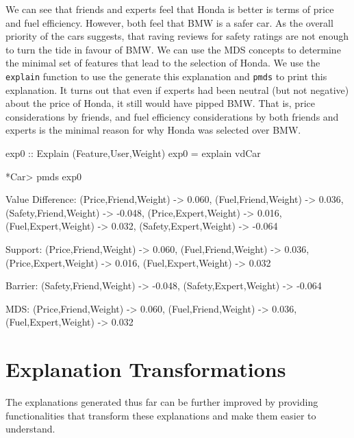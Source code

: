 \documentclass{jfp}
\newcommand{\prog}[1]{\texttt{#1}}
\begin{document}
We can see that friends and experts feel that Honda is better is terms of price and fuel efficiency. However, both feel that BMW is a safer car. As the overall priority of the cars suggests, that raving reviews for safety ratings are not enough to turn the tide in favour of BMW. We can use the MDS concepts to determine the minimal set of features that lead to the selection of Honda. We use the \prog{explain} function to use the generate this explanation and \prog{pmds} to print this explanation. It turns out that even if experts had been neutral (but not negative) about the price of Honda, it still would have pipped BMW. That is, price considerations by friends, and fuel efficiency considerations by both friends and experts is the minimal reason for why Honda was selected over BMW.
\begin{haskellcode}
exp0 :: Explain (Feature,User,Weight) 
exp0 = explain vdCar

*Car> pmds exp0

Value Difference: {(Price,Friend,Weight) -> 0.060,
                   (Fuel,Friend,Weight) -> 0.036,
                   (Safety,Friend,Weight) -> -0.048,
                   (Price,Expert,Weight) -> 0.016,
                   (Fuel,Expert,Weight) -> 0.032,
                   (Safety,Expert,Weight) -> -0.064}

Support: {(Price,Friend,Weight) -> 0.060,
          (Fuel,Friend,Weight) -> 0.036,
          (Price,Expert,Weight) -> 0.016,
          (Fuel,Expert,Weight) -> 0.032}

Barrier: {(Safety,Friend,Weight) -> -0.048,
          (Safety,Expert,Weight) -> -0.064}

MDS: {(Price,Friend,Weight) -> 0.060,
      (Fuel,Friend,Weight) -> 0.036,
      (Fuel,Expert,Weight) -> 0.032}
\end{haskellcode}

\section{Explanation Transformations}
The explanations generated thus far can be further improved by providing functionalities that transform these explanations and make them easier to understand.  
\end{document}
